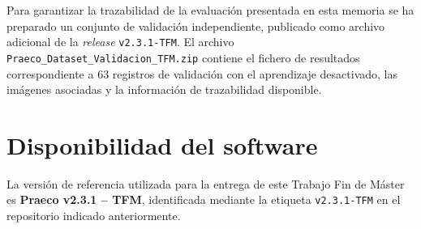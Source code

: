 Para garantizar la trazabilidad de la evaluación presentada en esta memoria se ha preparado un conjunto de validación independiente, publicado como archivo adicional de la \textit{release} \texttt{v2.3.1-TFM}. El archivo \texttt{Praeco\_Dataset\_Validacion\_TFM.zip} contiene el fichero de resultados correspondiente a 63 registros de validación con el aprendizaje desactivado, las imágenes asociadas y la información de trazabilidad disponible.

\section{Disponibilidad del software}
La versión de referencia utilizada para la entrega de este Trabajo Fin de Máster es \textbf{Praeco v2.3.1 -- TFM}, identificada mediante la etiqueta \texttt{v2.3.1-TFM} en el repositorio indicado anteriormente.
